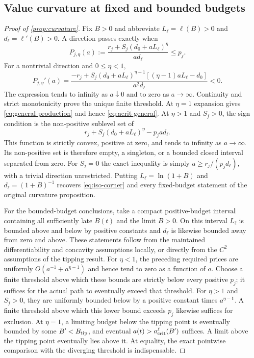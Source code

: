 \subsection{Value curvature at fixed and bounded budgets}
\label{app:curvature-proof}
\begin{proof}[Proof of \cref{prop:curvature}]
Fix $B>0$ and abbreviate $L_\ell=\ell(B)>0$ and
$d_\ell=\ell'(B)>0$. A direction passes exactly when
\[
 P_{j,\eta}(a):=\frac{r_j+S_j(d_0+aL_\ell)^\eta}{a d_\ell}
 \leq p_j.
\]
For a nontrivial direction and $0\leq\eta<1$,
\[
 P_{j,\eta}'(a)=\frac{-r_j+S_j(d_0+aL_\ell)^{\eta-1}
                    [(\eta-1)aL_\ell-d_0]}{a^2d_\ell}<0.
\]
The expression tends to infinity as $a\downarrow0$ and to zero as
$a\to\infty$. Continuity and strict monotonicity prove the unique
finite threshold. At $\eta=1$ expansion gives
\cref{eq:general-production} and hence \cref{eq:acrit-general}.
At $\eta>1$ and $S_j>0$, the sign condition is the non-positive
sublevel set of
\[
 r_j+S_j(d_0+aL_\ell)^\eta-p_ja d_\ell.
\]
This function is strictly convex, positive at zero, and tends to
infinity as $a\to\infty$. Its non-positive set is therefore empty,
a singleton, or a bounded closed interval separated from zero.
For $S_j=0$ the exact inequality is simply
$a\geq r_j/(p_jd_\ell)$, with a trivial direction unrestricted.
Putting $L_\ell=\ln(1+B)$ and $d_\ell=(1+B)^{-1}$ recovers
\cref{eq:iso-corner} and every fixed-budget statement of the original
curvature proposition.

For the bounded-budget conclusions, take a compact positive-budget
interval containing all sufficiently late $B(t)$ and the limit
$\bar B>0$. On this interval $L_\ell$ is bounded above and below by
positive constants and $d_\ell$ is likewise bounded away from zero
and above. These statements follow from the maintained differentiability
and concavity assumptions locally, or directly from the $C^2$ assumptions
of the tipping result. For $\eta<1$, the preceding required prices
are uniformly $O(a^{-1}+a^{\eta-1})$ and hence tend to zero as a
function of $a$. Choose a finite threshold above which these bounds are
strictly below every positive $p_j$; it suffices for the actual path to
eventually exceed that threshold. For $\eta>1$ and $S_j>0$, they are
uniformly bounded below by a positive constant times $a^{\eta-1}$.
A finite threshold above which this lower bound exceeds $p_j$ likewise
suffices for exclusion. At $\eta=1$, a limiting budget below the tipping
point is eventually bounded by some $B'<B_{\rm tip}$, and eventual
$a(t)>a_{\rm crit}^{\ell}(B')$ suffices. A limit above the tipping point
eventually lies above it.
At equality, the exact pointwise comparison with the diverging
threshold is indispensable.
\end{proof}

